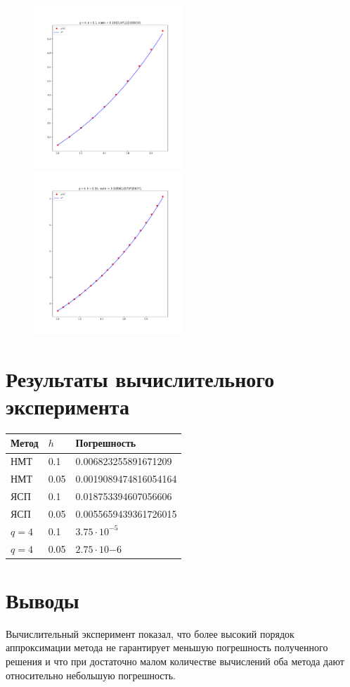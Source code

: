 \documentclass{article}
\begin{document}
\begin{figure}[H]
\includegraphics[width=0.5\textwidth]{Figure_5.png}
\includegraphics[width=0.5\textwidth]{Figure_6.png}
\end{figure}

\section*{Результаты вычислительного эксперимента}
\begin{tabular}[H]{|l|l|l|}
  \hline
  Метод & $h$ & Погрешность \\
  \hline
  НМТ &   0.1         &    0.006823255891671209 \\
  НМТ &   0.05        & 0.0019089474816054164    \\
  ЯСП &   0.1         &  0.018753394607056606   \\
  ЯСП &   0.05        &   0.0055659439361726015  \\
  $   q=4 $    & 0.1  & $3.75 \cdot 10^{-5} $  \\
  $   q=4 $    & 0.05 &  $2.75 \cdot 10 {-6}$ \\
  \hline
\end{tabular} 
\section*{Выводы}
Вычислительный эксперимент показал, что более высокий порядок аппроксимации
метода не гарантирует меньшую погрешность полученного решения и что при
достаточно малом количестве вычислений оба метода дают относительно небольшую
погрешность.
\end{document}
